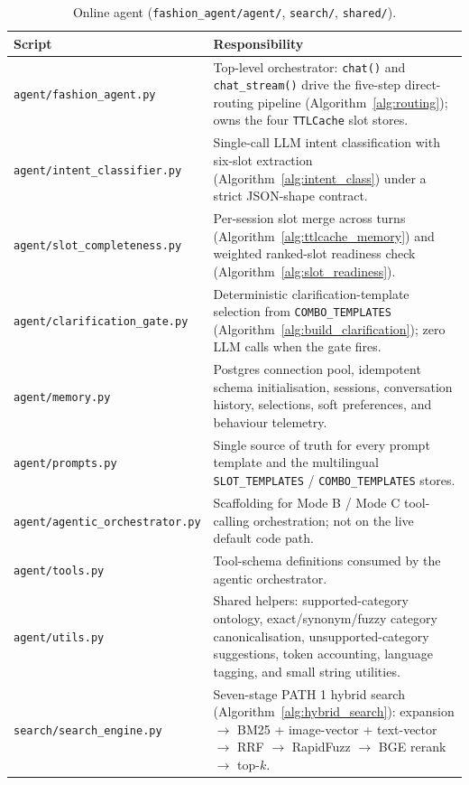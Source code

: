 \begin{table}[H]
\centering
\caption{Online agent (\texttt{fashion\_agent/agent/}, \texttt{search/}, \texttt{shared/}).}
\label{tab:impl_online_agent_scripts}
\small
\begin{tabular}{p{6.0cm} p{8.6cm}}
\toprule
\textbf{Script} & \textbf{Responsibility} \\
\midrule
\texttt{agent/fashion\_agent.py} & Top-level orchestrator: \texttt{chat()} and \texttt{chat\_stream()} drive the five-step direct-routing pipeline (Algorithm~\ref{alg:routing}); owns the four \texttt{TTLCache} slot stores. \\
\texttt{agent/intent\_classifier.py} & Single-call LLM intent classification with six-slot extraction (Algorithm~\ref{alg:intent_class}) under a strict JSON-shape contract. \\
\texttt{agent/slot\_completeness.py} & Per-session slot merge across turns (Algorithm~\ref{alg:ttlcache_memory}) and weighted ranked-slot readiness check (Algorithm~\ref{alg:slot_readiness}). \\
\texttt{agent/clarification\_gate.py} & Deterministic clarification-template selection from \texttt{COMBO\_TEMPLATES} (Algorithm~\ref{alg:build_clarification}); zero LLM calls when the gate fires. \\
\texttt{agent/memory.py} & Postgres connection pool, idempotent schema initialisation, sessions, conversation history, selections, soft preferences, and behaviour telemetry. \\
\texttt{agent/prompts.py} & Single source of truth for every prompt template and the multilingual \texttt{SLOT\_TEMPLATES} / \texttt{COMBO\_TEMPLATES} stores. \\
\texttt{agent/agentic\_orchestrator.py} & Scaffolding for Mode B / Mode C tool-calling orchestration; not on the live default code path. \\
\texttt{agent/tools.py} & Tool-schema definitions consumed by the agentic orchestrator. \\
\texttt{agent/utils.py} & Shared helpers: supported-category ontology, exact/synonym/fuzzy category canonicalisation, unsupported-category suggestions, token accounting, language tagging, and small string utilities. \\
\texttt{search/search\_engine.py} & Seven-stage PATH 1 hybrid search (Algorithm~\ref{alg:hybrid_search}): expansion $\rightarrow$ BM25 + image-vector + text-vector $\rightarrow$ RRF $\rightarrow$ RapidFuzz $\rightarrow$ BGE rerank $\rightarrow$ top-$k$. \\

\end{tabular}
\end{table}
